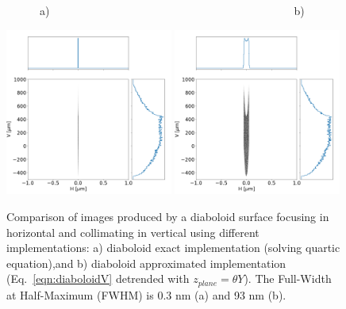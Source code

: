\documentclass{iucr}              %
\begin{document}
\begin{figure}\label{fig:pointToSegment}
\flushleft
~~~~~~a)~~~~~~~~~~~~~~~~~~~~~~~~~~~~~~~~~~~~~~~~~~~~b)\\
\centering

\includegraphics[width=0.49\textwidth]{figures/p2s_V_z.png}
\includegraphics[width=0.49\textwidth]{figures/p2s_K_z.png} \\
\flushleft
\caption{Comparison of images produced by a diaboloid surface focusing in horizontal and collimating in vertical using different implementations: a) diaboloid exact implementation (solving quartic equation),and b) diaboloid approximated implementation (Eq.~\ref{eqn:diaboloidV} detrended with $z_{plane}=\theta Y$).
The Full-Width at Half-Maximum (FWHM) is 0.3 nm (a) and 93 nm (b).
}
\end{figure}
\end{document}
